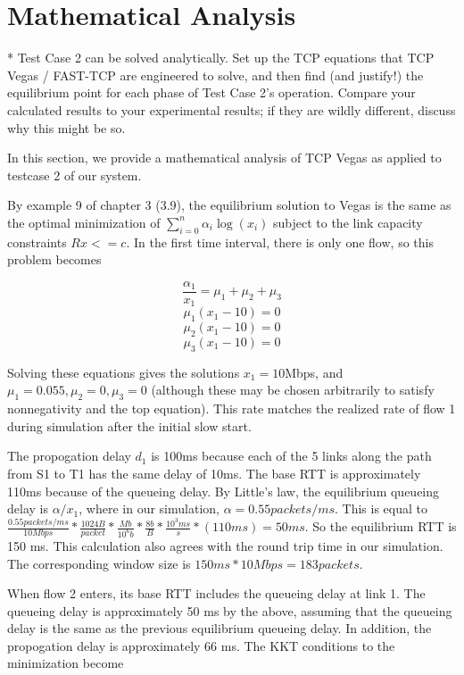 

\section{Mathematical Analysis}

* Test Case 2 can be solved analytically. Set up
the TCP equations that TCP Vegas / FAST-TCP are
engineered to solve, and then find (and justify!)
the equilibrium point for each phase of Test Case
2's operation. Compare your calculated results to
your experimental results; if they are wildly
different, discuss why this might be so.

In this section, we provide a mathematical analysis of TCP Vegas as applied to testcase 2 of our system. 

By example 9 of chapter 3 (3.9), the equilibrium solution to Vegas is the same as the optimal minimization of $\displaystyle\sum\limits_{i=0}^n \alpha_i \log(x_i)$ subject to the link capacity constraints $Rx <= c$. In the first time interval, there is only one flow, so this problem becomes

$$\frac{\alpha_1}{x_1}=\mu_1 + \mu_2 + \mu_3$$
$$\mu_1 (x_1 - 10) = 0$$
$$\mu_2 (x_1 - 10) = 0$$
$$\mu_3 (x_1 - 10) = 0$$

Solving these equations gives the solutions $x_1=10$Mbps, and $\mu_1 = 0.055, \mu_2 = 0, \mu_3 = 0$ (although these may be chosen arbitrarily to satisfy nonnegativity and the top equation). This rate matches the realized rate of flow 1 during simulation after the initial slow start.

The propogation delay $d_1$ is 100ms because each of the 5 links along the path from S1 to T1 has the same delay of 10ms. The base RTT is approximately 110ms because of the queueing delay. By Little's law, the equilibrium queueing delay is $\alpha /  x_1$, where in our simulation, $\alpha = 0.55 packets/ms$. This is equal to $\frac{0.55 packets/ms}{10 Mbps} * \frac{1024 B}{packet} * \frac{Mb}{10^6 b} * \frac{8 b}{B} * \frac{10^3 ms}{s} * (110 ms) = 50 ms$. So the equilibrium RTT is 150 ms. This calculation also agrees with the round trip time in our simulation. The corresponding window size is $150ms * 10Mbps = 183 packets$.

When flow 2 enters, its base RTT includes the queueing delay at link 1. The queueing delay is approximately 50 ms by the above, assuming that the queueing delay is the same as the previous equilibrium queueing delay. In addition, the propogation delay is approximately 66 ms. The KKT conditions to the minimization become

